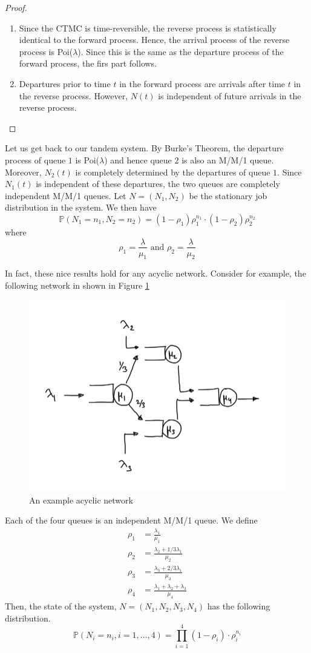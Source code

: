 \documentclass[12pt]{article}
\def\P{\mathbb{P}}
\theoremstyle{definition}
\begin{document}
\begin{proof}
    \phantom{hi}
    \begin{enumerate}
        \item Since the CTMC is time-reversible, the reverse process is statistically identical to the forward process. Hence, the arrival process of the reverse process is Poi($\lambda$). Since this is the same as the departure process of the forward process, the firs part follows.
        
        \item Departures prior to time $t$ in the forward process are arrivals after time $t$ in the reverse process. However, $N(t)$ is independent of future arrivals in the reverse process.
    \end{enumerate}
\end{proof}

Let us get back to our tandem system. By Burke's Theorem, the departure process of queue $1$ is Poi($\lambda$) and hence queue $2$ is also an M/M/1 queue. Moreover, $N_2(t)$ is completely determined by the departures of queue $1$. Since $N_1(t)$ is independent of these departures, the two queues are completely independent M/M/1 queues. Let $N = (N_1, N_2)$ be the stationary job distribution in the system. We then have
\[
    \P\left( N_1 = n_1, N_2 = n_2 \right) = (1-\rho_1)\rho_1^{n_1} \cdot (1-\rho_2)\rho_2^{n_2}
\]
where 
\[
    \rho_1 = \frac{\lambda}{\mu_1} \text{ and } \rho_2 = \frac{\lambda}{\mu_2}
\]

In fact, these nice results hold for any acyclic network. Consider for example, the following network in shown in Figure \ref{fig:acyclic}

\begin{figure}[!h]
    \centering
    \includegraphics[width=0.6\linewidth]{AcyclicNetwork.PNG}
    \caption{An example acyclic network}
    \label{fig:acyclic}
\end{figure}

Each of the four queues is an independent M/M/1 queue. We define
\begin{align*}
    \rho_1 &= \frac{\lambda_1}{\mu_1} \\
    \rho_2 &= \frac{\lambda_2 + 1/3\lambda_1}{\mu_2} \\
    \rho_3 &= \frac{\lambda_3 + 2/3\lambda_1}{\mu_3} \\
    \rho_4 &= \frac{\lambda_1 + \lambda_2 + \lambda_3}{\mu_4}
\end{align*}
Then, the state of the system, $N = (N_1, N_2, N_3, N_4)$ has the following distribution.
\[
    \P\left( N_i = n_i , i = 1, \ldots, 4 \right) = \prod_{i=1}^4 (1-\rho_i) \cdot \rho_i^{n_i}
\]
\end{document}
